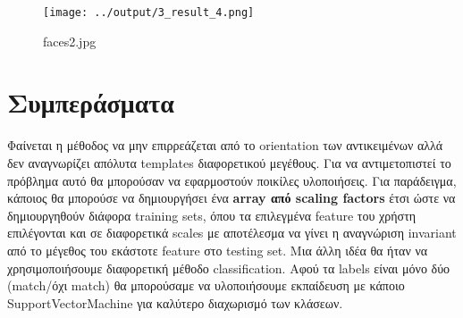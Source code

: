 \documentclass[11pt]{scrartcl} %
\begin{document}
\begin{figure}[H]
  \texttt{[image: ../output/3\_result\_4.png]}
  \caption{faces2.jpg}
\end{figure}

\section{Συμπεράσματα}

Φαίνεται η μέθοδος να μην επιρρεάζεται από το orientation των αντικειμένων αλλά
δεν αναγνωρίζει απόλυτα templates διαφορετικού μεγέθους. Για να αντιμετοπιστεί
το πρόβλημα αυτό θα μπορούσαν να εφαρμοστούν ποικίλες υλοποιήσεις. Για παράδειγμα,
κάποιος θα μπορούσε να δημιουργήσει ένα \textbf{array από scaling factors} έτσι
ώστε να δημιουργηθούν διάφορα training sets, όπου τα επιλεγμένα feature του χρήστη
επιλέγονται και σε διαφορετικά scales με αποτέλεσμα να γίνει η αναγνώριση invariant
από το μέγεθος του εκάστοτε feature στο testing set. Μια άλλη ιδέα θα ήταν να χρησιμοποιήσουμε
διαφορετική μέθοδο classification. Αφού τα labels είναι μόνο δύο (match/όχι match)
θα μπορούσαμε να υλοποιήσουμε εκπαίδευση με κάποιο SupportVectorMachine για καλύτερο
διαχωρισμό των κλάσεων.
\end{document}
